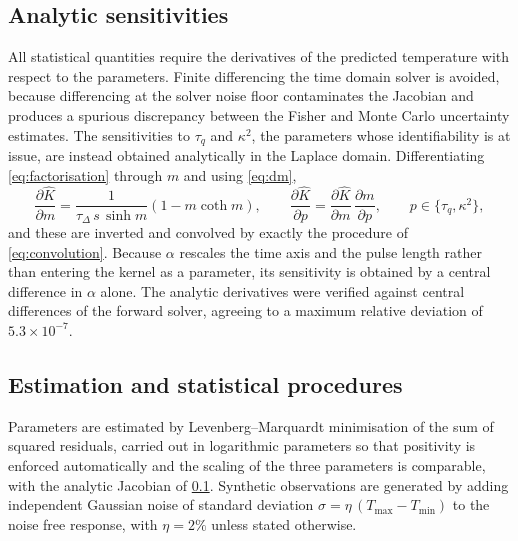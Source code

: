 \documentclass[preprint,12pt,a4paper]{elsarticle}
\theoremstyle{plain}
\theoremstyle{definition}
\theoremstyle{remark}
\newcommand{\tq}{\tau_{q}}
\newcommand{\kk}{\kappa^{2}}
\begin{document}
\subsection{Analytic sensitivities}
\label{sec:methods-sens}

All statistical quantities require the derivatives of the predicted temperature
with respect to the parameters. Finite differencing the time domain solver is
avoided, because differencing at the solver noise floor contaminates the
Jacobian and produces a spurious discrepancy between the Fisher and Monte Carlo
uncertainty estimates. The
sensitivities to $\tq$ and $\kk$, the parameters whose identifiability is at
issue, are instead obtained analytically in the Laplace domain. Differentiating
\eqref{eq:factorisation} through $m$ and using \eqref{eq:dm},
%
\begin{equation}
  \frac{\partial \hat{K}}{\partial m}
  = \frac{1}{\tau_{\Delta}\,s\,\sinh m}\left(1 - m \coth m\right),
  \qquad
  \frac{\partial \hat{K}}{\partial p}
  = \frac{\partial \hat{K}}{\partial m}\,\frac{\partial m}{\partial p},
  \qquad p \in \{\tq, \kk\} ,
  \label{eq:sens}
\end{equation}
%
and these are inverted and convolved by exactly the procedure of
\eqref{eq:convolution}. Because $\alpha$ rescales the time axis and the pulse
length rather than entering the kernel as a parameter, its sensitivity is
obtained by a central difference in $\alpha$ alone. The analytic derivatives
were verified against central differences of the forward solver, agreeing to a
maximum relative deviation of $5.3\times10^{-7}$.

\subsection{Estimation and statistical procedures}
\label{sec:methods-stats}

Parameters are estimated by Levenberg--Marquardt minimisation \cite{Najafi2024} of the sum of
squared residuals, carried out in logarithmic parameters so that positivity is
enforced automatically and the scaling of the three parameters is comparable,
with the analytic Jacobian of \cref{sec:methods-sens}. Synthetic observations
are generated by adding independent Gaussian noise of standard deviation
$\sigma = \eta\,(T_{\max}-T_{\min})$ to the noise free response, with
$\eta = 2\%$ unless stated otherwise.
\end{document}

